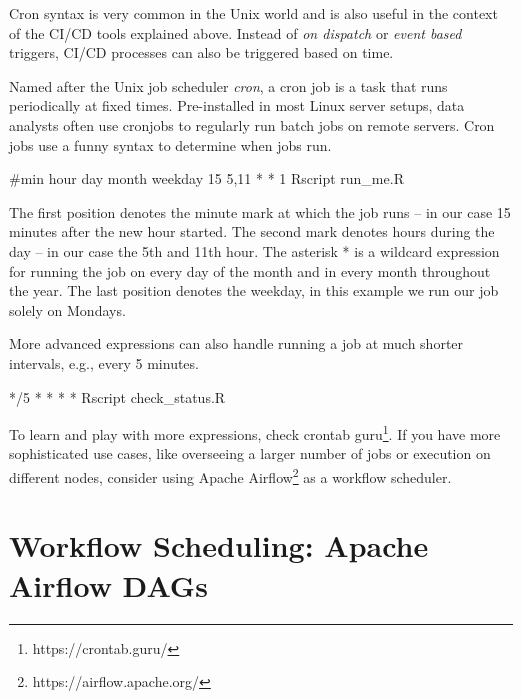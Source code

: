 \documentclass[
  12pt,
  letterpaper,
]{krantz}
\newenvironment{Shaded}{\begin{snugshade}}{\end{snugshade}}
\newcommand{\CommentTok}[1]{\textcolor[rgb]{0.37,0.37,0.37}{#1}}
\newcommand{\ExtensionTok}[1]{\textcolor[rgb]{0.00,0.23,0.31}{#1}}
\newcommand{\NormalTok}[1]{\textcolor[rgb]{0.00,0.23,0.31}{#1}}
\newcommand{\PreprocessorTok}[1]{\textcolor[rgb]{0.68,0.00,0.00}{#1}}
\begin{document}
Cron syntax is very common in the Unix world and is also useful in the
context of the CI/CD tools explained above. Instead of
\emph{on dispatch} or \emph{event based} triggers, CI/CD
processes can also be triggered based on time.

Named after the Unix job scheduler \emph{cron}, a cron job is a task
that runs periodically at fixed times. Pre-installed in most Linux
server setups, data analysts often use cronjobs to
regularly run batch jobs on remote servers. Cron jobs use a funny syntax
to determine when jobs run.

\begin{Shaded}
\begin{Highlighting}[]
\CommentTok{\#min hour day month weekday}
\ExtensionTok{15}\NormalTok{ 5,11 }\PreprocessorTok{*} \PreprocessorTok{*}\NormalTok{ 1 Rscript run\_me.R}
\end{Highlighting}
\end{Shaded}

The first position denotes the minute mark at which the job runs -- in
our case 15 minutes after the new hour started. The second mark denotes
hours during the day -- in our case the 5th and 11th hour. The asterisk
* is a wildcard expression for running the job on every day of the month
and in every month throughout the year. The last position denotes the
weekday, in this example we run our job solely on Mondays.

More advanced expressions can also handle running a job at much shorter
intervals, e.g., every 5 minutes.

\begin{Shaded}
\begin{Highlighting}[]
\ExtensionTok{*/5} \PreprocessorTok{*} \PreprocessorTok{*} \PreprocessorTok{*} \PreprocessorTok{*}\NormalTok{ Rscript check\_status.R}
\end{Highlighting}
\end{Shaded}

To learn and play with more expressions, check crontab guru\footnote{https://crontab.guru/}.
If you have more sophisticated use cases, like overseeing a larger
number of jobs or execution on different nodes, consider using Apache
Airflow\footnote{https://airflow.apache.org/} as a
workflow scheduler.

\hypertarget{workflow-scheduling-apache-airflow-dags}{%
\section{\texorpdfstring{Workflow Scheduling: Apache
Airflow
DAGs}{Workflow Scheduling: Apache Airflow DAGs}}\label{workflow-scheduling-apache-airflow-dags}}
\end{document}
